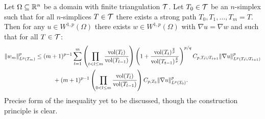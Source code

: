 \documentclass[a4paper]{article}
\begin{document}
\begin{theorem}\label{theorem:poincarefriedrichsestimate:gradzwei}
    Let $\Omega \subseteq {\mathbb R}^{n}$ be a domain with finite triangulation ${\mathcal T}$.
    Let $T_0 \in {\mathcal T}$ be an $n$-simplex such that for all $n$-simplices $T \in {\mathcal T}$ 
    there exists a strong path $T_0, T_1, \dots, T_m = T$.
    Then for any $u \in W^{1,p}(\Omega)$ 
    there exists $w \in W^{1,p}(\Omega)$ with $\nabla u = \nabla w$ 
    and such that for all $T \in {\mathcal T}$:
    \begin{align*}
        \| w_{m} \|_{L^{p}(T_m)}^{p}
        &\leq 
        (m+1)^{p-1}
        \sum_{t=1}^{m} 
        \left( 
            \prod_{t < l \leq m} 
            \frac{ \operatorname{vol}(T_l) }{ \operatorname{vol}(T_{l-1}) } 
        \right)
        \left( 1 + \frac{ \operatorname{vol}(T_t)^{\frac q p} }{ \operatorname{vol}(T_{t-1})^{\frac q p} } \right)^{p/q}
        C_{p,T_{t} \cup T_{t+1}}
        \| \nabla u \|_{L^{p}( T_{t} \cup T_{t+1} )}^{p}
        \\&\quad \quad \quad 
        +
        (m+1)^{p-1}
        \left( 
            \prod_{0 < l \leq m} 
            \frac{ \operatorname{vol}(T_l) }{ \operatorname{vol}(T_{l-1}) } 
        \right)
        C_{p,T_{0}}
        \| \nabla u \|_{L^{p}(T_{0})}^{p}
        .
    \end{align*}
    \color{red}Precise form of the inequality yet to be discussed, though the construction principle is clear.
\end{theorem}
\end{document}
